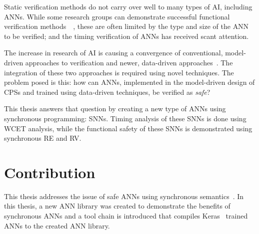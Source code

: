 Static verification methods do not carry over well to many types of \ac{AI}, including \acp{ANN}.
While some research groups can demonstrate successful functional verification methods~\cite{Gehr2018AI2SA}~\cite{reluplex}, these are often limited by the type and size of the \ac{ANN} to be verified; and the timing verification of \acp{ANN} has received scant attention.

The increase in research of \ac{AI} is causing a convergence of conventional, model-driven approaches to verification and newer, data-driven approaches~\cite{dmd2019}.
The integration of these two approaches is required using novel techniques.
The problem posed is this: how can \acp{ANN}, implemented in the model-driven design of \acp{CPS} and trained using data-driven techniques, be verified as \textit{safe}?

This thesis answers that question by creating a new type of \acp{ANN} using synchronous programming: \acfp{SNN}.
Timing analysis of these \acp{SNN} is done using \acf{WCET} analysis, while the functional safety of these \acp{SNN} is demonstrated using synchronous \acf{RE} and \acf{RV}.

\section{Contribution}
This thesis addresses the issue of safe \acp{ANN} using synchronous semantics~\cite{berry1991}.
In this thesis, a new \ac{ANN} library was created to demonstrate the benefits of synchronous \acp{ANN} and a tool chain is introduced that compiles Keras~\cite{chollet2015keras} trained \acp{ANN} to the created \ac{ANN} library.

